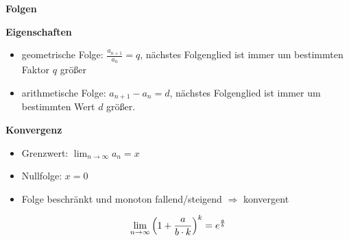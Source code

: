 \documentclass[10pt,landscape,a4paper]{article}
\begin{document}
\begin{multicols*}{4}
\begin{center}
	\normalsize{\textbf{Folgen}}
\end{center}
\textbf{Eigenschaften}
\begin{itemize}
	\item geometrische Folge: $\frac{a_{n+1}}{a_n}=q$, nächstes Folgenglied ist immer um bestimmten Faktor $q$ größer
	\item arithmetische Folge: $a_{n+1}-a_n=d$, nächstes Folgenglied ist immer um bestimmten Wert $d$ größer.
\end{itemize}
\textbf{Konvergenz}
\begin{itemize}
	\item Grenzwert: $\lim_{n\to\infty} a_n = x$
	\item Nullfolge: $x=0$
	\item Folge beschränkt und monoton fallend/steigend $\Rightarrow$ konvergent
\end{itemize}
\begin{align}
	\lim_{n\to\infty}\left(1+\frac{a}{b\cdot k}\right)^k = e^{\frac{a}{b}} \notag
\end{align}


\end{multicols*}
\end{document}
